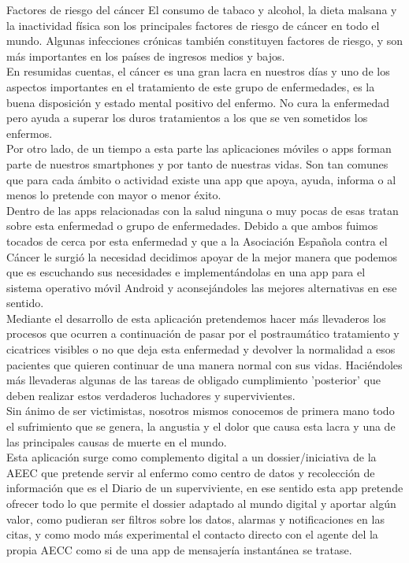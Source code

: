\documentclass[../pfc.tex]{subfiles}
\begin{document}
Factores de riesgo del cáncer
El consumo de tabaco y alcohol, la dieta malsana y la inactividad física son los principales factores de riesgo de cáncer en todo el mundo. Algunas infecciones crónicas también constituyen factores de riesgo, y son más importantes en los países de ingresos medios y bajos.\\

En resumidas cuentas, el cáncer es una gran lacra en nuestros días \cite{OMS} y uno de los aspectos importantes en el tratamiento de este grupo de enfermedades, es la buena disposición y estado mental positivo del enfermo. No cura la enfermedad pero ayuda a superar los duros tratamientos a los que se ven sometidos los enfermos.\\

Por otro lado, de un tiempo a esta parte las aplicaciones móviles o apps forman parte de nuestros smartphones y por tanto de nuestras vidas. Son tan comunes que para cada ámbito o actividad existe una app que apoya, ayuda, informa o al menos lo pretende con mayor o menor éxito.\\

Dentro de las apps relacionadas con la salud ninguna o muy pocas de esas tratan sobre esta enfermedad o grupo de enfermedades. Debido a que ambos fuimos tocados de cerca por esta enfermedad y que a la Asociación Española contra el Cáncer le surgió la necesidad decidimos apoyar de la mejor manera que podemos que es escuchando sus necesidades e implementándolas en una app para el sistema operativo móvil Android y aconsejándoles las mejores alternativas en ese sentido. \\

Mediante el desarrollo de esta aplicación pretendemos hacer más llevaderos los procesos que ocurren a continuación de pasar por el postraumático tratamiento y cicatrices visibles o no que deja esta enfermedad y devolver la normalidad a esos pacientes que quieren continuar de una manera normal con sus vidas. Haciéndoles más llevaderas algunas de las tareas de obligado cumplimiento 'posterior' que deben realizar estos verdaderos luchadores y supervivientes.\\
Sin ánimo de ser victimistas, nosotros mismos conocemos de primera mano todo el sufrimiento que se genera, la angustia y el dolor que causa esta lacra y una de las principales causas de muerte en el mundo.\\

Esta aplicación surge como complemento digital a un dossier/iniciativa de la AEEC que pretende servir al enfermo como centro de datos y recolección de información que es el  Diario de un superviviente, en ese sentido esta app pretende ofrecer todo lo que permite el dossier adaptado al mundo digital y aportar algún valor, como pudieran ser filtros sobre los datos, alarmas y notificaciones en las citas, y como modo más experimental el contacto directo con el agente del la propia AECC como si de una app de mensajería instantánea se tratase. \\
\end{document}
